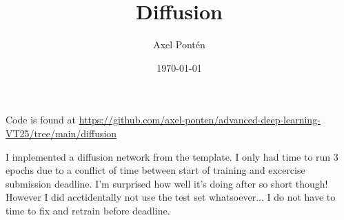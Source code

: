 \documentclass[12pt, a4paper]{article}
\title{Diffusion}
\author{Axel Pontén}
\date{\today}
\begin{document}
\maketitle

Code is found at \url{https://github.com/axel-ponten/advanced-deep-learning-VT25/tree/main/diffusion}

I implemented a diffusion network from the template. I only had time to run 3 epochs due to a conflict of time between start of training and excercise submission deadline. I'm surprised how well it's doing after so short though! However I did acctidentally not use the test set whatsoever... I do not have to time to fix and retrain before deadline.
\end{document}

